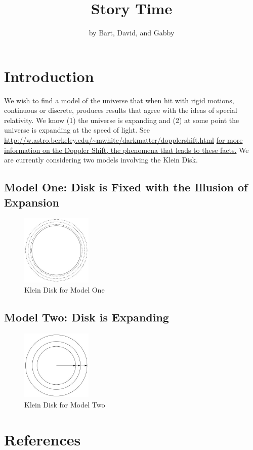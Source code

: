 \documentclass[12pt]{article}
\theoremstyle{plain}
\theoremstyle{definition}
\begin{document}
\title{Story Time}
\author{by Bart, David, and Gabby}
\maketitle

\section{Introduction}

We wish to find a model of the universe that when hit with rigid motions, continuous or discrete, produces results that agree with the ideas of special relativity. We know (1) the universe is expanding and (2) at some point the universe is expanding at the speed of light. See 
\url{http://w.astro.berkeley.edu/~mwhite/darkmatter/dopplershift.html} \href{http://w.astro.berkeley.edu/}{for more information on the Doppler Shift, the phenomena that leads to these facts.}
We are currently considering two models involving the Klein Disk. 

\subsection{Model One: Disk is Fixed with the Illusion of Expansion}

\begin{figure}[h!]
\centering
\includegraphics[width=0.3\textwidth]{fixedDisk}
\caption{Klein Disk for Model One}
\end{figure}

\subsection{Model Two: Disk is Expanding}
\begin{figure}[h!]
\centering
\includegraphics[width=0.3\textwidth]{expandingDisk}
\caption{Klein Disk for Model Two}
\end{figure}

\section{References}
 
\end{document}
